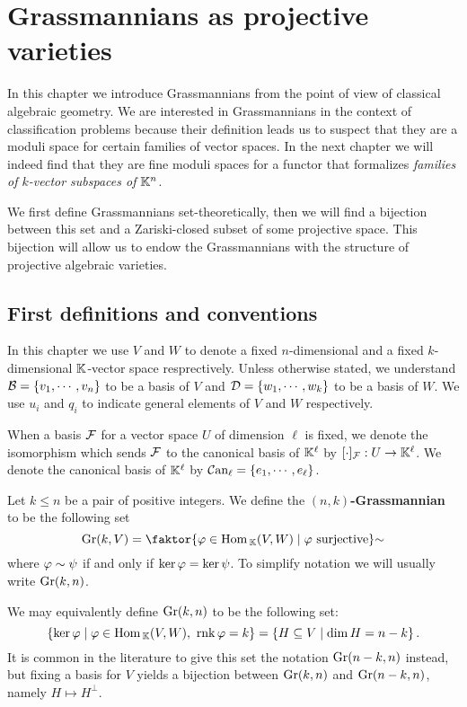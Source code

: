 \chapter{Grassmannians as projective varieties}
In this chapter we introduce Grassmannians from the point of view of classical algebraic geometry. We are interested in Grassmannians in the context of classification problems because their definition leads us to suspect that they are a moduli space for certain families of vector spaces. In the next chapter we will indeed find that they are fine moduli spaces for a functor that formalizes \textit{families of $k$-vector subspaces of $\mathbb{K}^n$}.

We first define Grassmannians set-theoretically, then we will find a bijection between this set and a Zariski-closed subset of some projective space. This bijection will allow us to endow the Grassmannians with the structure of projective algebraic varieties.

\section{First definitions and conventions}
\begin{notation}
In this chapter we use $V$ and $W$ to denote a fixed $n$-dimensional and a fixed $k$-dimensional $\mathbb{K}$-vector space resprectively. 
Unless otherwise stated, we understand $\mathcal{B}=\left\{{v_1,\cdots, v_n}\right\}$ to be a basis of $V$ and $\mathcal{D}=\left\{{w_1,\cdots, w_k}\right\}$ to be a basis of $W$. We use $u_i$ and $q_i$ to indicate general elements of $V$ and $W$ respectively.

When a basis $\mathcal{F}$ for a vector space $U$ of dimension $\ell$ is fixed, we denote the isomorphism which sends $\mathcal{F}$ to the canonical basis of $\mathbb{K}^\ell$ by $[\cdot]_{\mathcal{F}}:U\to \mathbb{K}^\ell$. We denote the canonical basis of $\mathbb{K}^\ell$ by ${\mathcal{C}\mathrm{an}}_\ell=\left\{{e_1,\cdots, e_\ell}\right\}$.
\end{notation}

\begin{definition}[Grassmannian]
Let $k\leq n$ be a pair of positive integers. We define the \textbf{$(n,k)$-Grassmannian} to be the following set
\[\Gr(k,V)=\quot{\cpa{\vp\in\Hom_\K(V,W)\mid \vp\text{ surjective}}}\sim\]
where $\varphi\sim \psi$ if and only if $\ker \varphi=\ker \psi$. To simplify notation we will usually write $\mathrm{Gr}(k,n)$.
\end{definition}

\begin{remark}
We may equivalently define $\mathrm{Gr}(k,n)$ to be the following set:
\[\left\{{\ker \varphi\mid \varphi\in \mathrm{Hom}\,_{\mathbb{K}}(V,W),\ \mathrm{rnk}\, \varphi=k}\right\}=\left\{{H\subseteq V\mid \dim H=n-k}\right\}.\]
It is common in the literature to give this set the notation $\mathrm{Gr}(n-k,n)$ instead, but fixing a basis for $V$ yields a bijection between $\mathrm{Gr}(k,n)$ and $\mathrm{Gr}(n-k,n)$, namely $H\mapsto H^\perp$.
\end{remark}

